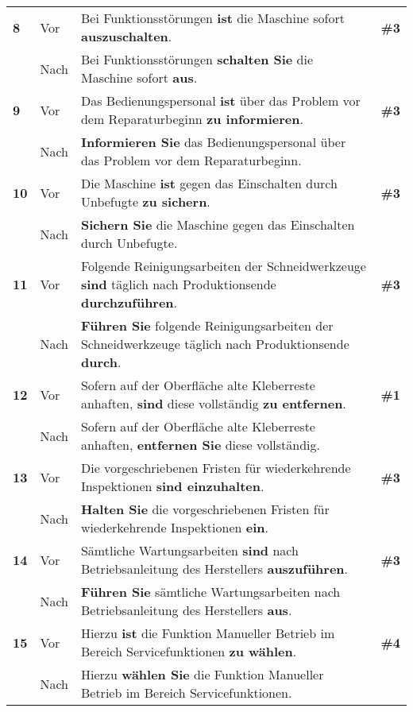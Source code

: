 \begin{longtable}{llp{}l}
{ \textbf{8}} & Vor & Bei Funktionsstörungen \textbf{ist} die Maschine sofort \textbf{auszuschalten}. & \textbf{\#3}\\
& Nach & Bei Funktionsstörungen \textbf{schalten Sie} die Maschine sofort \textbf{aus}. & \\
\tablevspace
{ \textbf{9}} & Vor & Das Bedienungspersonal \textbf{ist} über das Problem vor dem Reparaturbeginn \textbf{zu informieren}. & \textbf{\#3}\\
& Nach & \textbf{Informieren Sie} das Bedienungspersonal über das Problem vor dem Reparaturbeginn. & \\
\tablevspace
{ \textbf{10}} & Vor & Die Maschine \textbf{ist} gegen das Einschalten durch Unbefugte \textbf{zu sichern}. & \textbf{\#3}\\
& Nach & \textbf{Sichern Sie} die Maschine gegen das Einschalten durch Unbefugte. & \\
\tablevspace
{ \textbf{11}} & Vor & Folgende Reinigungsarbeiten der Schneidwerkzeuge \textbf{sind} täglich nach Produktionsende \textbf{durchzuführen}. & \textbf{\#3}\\
& Nach & \textbf{Führen Sie} folgende Reinigungsarbeiten der Schneidwerkzeuge täglich nach Produktionsende \textbf{durch}. & \\
\tablevspace
{ \textbf{12}} & Vor & Sofern auf der Oberfläche alte Kleberreste anhaften, \textbf{sind} diese vollständig \textbf{zu entfernen}. & \textbf{\#1}\\
& Nach & Sofern auf der Oberfläche alte Kleberreste anhaften, \textbf{entfernen Sie} diese vollständig. & \\
\tablevspace
{ \textbf{13}} & Vor & Die vorgeschriebenen Fristen für wiederkehrende Inspektionen \textbf{sind einzuhalten}. & \textbf{\#3}\\
& Nach & \textbf{Halten Sie} die vorgeschriebenen Fristen für wiederkehrende Inspektionen \textbf{ein}. & \\
\tablevspace
{ \textbf{14}} & Vor & Sämtliche Wartungsarbeiten \textbf{sind} nach Betriebsanleitung des Herstellers \textbf{auszuführen}. & \textbf{\#3}\\
& Nach & \textbf{Führen Sie} sämtliche Wartungsarbeiten nach Betriebsanleitung des Herstellers \textbf{aus}. & \\
\tablevspace
{ \textbf{15}} & Vor & Hierzu \textbf{ist} die Funktion Manueller Betrieb im Bereich Servicefunktionen \textbf{zu wählen}. & \textbf{\#4}\\
& Nach & Hierzu \textbf{wählen Sie} die Funktion Manueller Betrieb im Bereich Servicefunktionen. & \\

\end{longtable}
